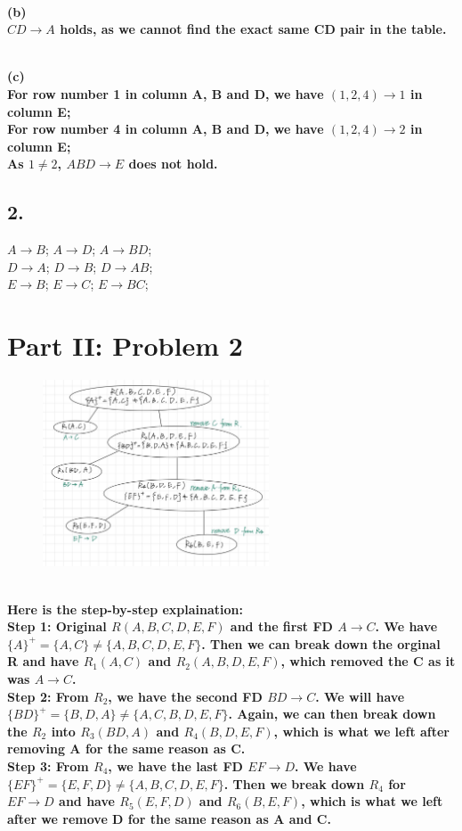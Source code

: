 \documentclass[letterpaper,11pt]{article}
\newcommand{\Paragraph}[1]{~\vspace*{-0.7\baselineskip}\\{\bf #1}}
\begin{document}
\Paragraph{(b)\\
	\(CD \rightarrow A\) holds, as we cannot find the exact same CD pair in the table. 
}

\Paragraph{(c)\\
	For row number 1 in column A, B and D, we have \((1, 2, 4) \rightarrow 1\) in column E; \\
	For row number 4 in column A, B and D, we have \((1, 2, 4) \rightarrow 2\) in column E; \\
	As \(1 \neq 2\), \(ABD \rightarrow E\) does not hold. 
}

\subsection*{2.}
\(A\rightarrow B\); \(A \rightarrow D\); \(A \rightarrow BD\); \\
\(D \rightarrow A\); \(D \rightarrow B\); \(D\rightarrow AB\); \\
\(E \rightarrow B\); \(E \rightarrow C\); \(E \rightarrow BC\); 

\section*{Part II: Problem 2}
\begin{figure}[h]
    \centering
    \includegraphics[width=0.6\textwidth]{p2-2.jpg}
\end{figure}
\Paragraph{
	Here is the step-by-step explaination: \\
	Step 1: Original \(R(A, B, C, D, E, F)\) and the first FD \(A \rightarrow C\). We have \(\{A\}^+ = \{A, C\} \neq \{A, B, C, D, E, F\}\).
	Then we can break down the orginal R and have \(R_1(A, C)\) and \(R_2(A, B, D, E, F)\), which removed the C as it was \(A \rightarrow C\). \\
	Step 2: From \(R_2\), we have the second FD \(BD \rightarrow C\). We will have \(\{BD\}^+ = \{B, D, A\} \neq \{A, C, B, D, E, F\}\). 
	Again, we can then break down the \(R_2\) into \(R_3(BD, A)\) and \(R_4(B, D, E, F)\), which is what we left after removing A for the same reason as C.\\
	Step 3: From  \(R_4\), we have the last FD \(EF \rightarrow D\). We have \(\{EF\}^+ = \{E, F, D\} \neq \{A, B, C, D, E, F\}\). 
	Then we break down \(R_4\) for \(EF \rightarrow D\) and have \(R_5(E, F, D)\) and \(R_6(B, E, F)\), which is what we left after we remove D for the same reason as A and C. \\
}
\end{document}
